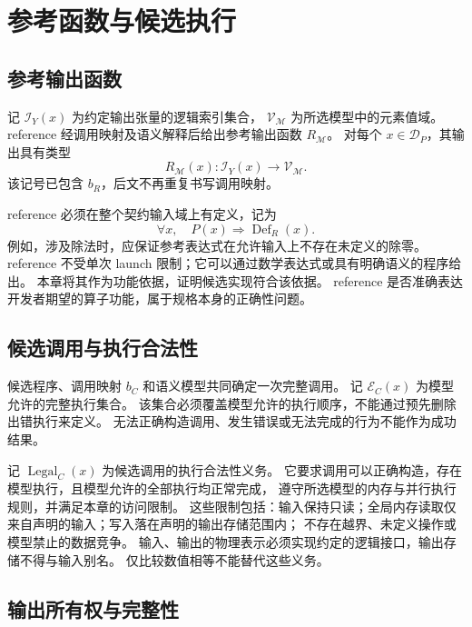 \section{参考函数与候选执行}
\label{sec:opv-semantics}

\subsection{参考输出函数}

记 $\mathcal{I}_Y(x)$ 为约定输出张量的逻辑索引集合，
$\mathcal{V}_{\mathcal{M}}$ 为所选模型中的元素值域。
reference 经调用映射及语义解释后给出参考输出函数 $R_{\mathcal{M}}$。
对每个 $x\in\mathcal{D}_P$，其输出具有类型
\begin{equation}
  R_{\mathcal{M}}(x):
  \mathcal{I}_Y(x)\longrightarrow\mathcal{V}_{\mathcal{M}}.
  \label{eq:opv-reference}
\end{equation}
该记号已包含 $b_R$，后文不再重复书写调用映射。

reference 必须在整个契约输入域上有定义，记为
\begin{equation}
  \forall x,\quad
  P(x)\Longrightarrow\operatorname{Def}_R(x).
  \label{eq:opv-reference-defined}
\end{equation}
例如，涉及除法时，应保证参考表达式在允许输入上不存在未定义的除零。
reference 不受单次 launch 限制；它可以通过数学表达式或具有明确语义的程序给出。
本章将其作为功能依据，证明候选实现符合该依据。
reference 是否准确表达开发者期望的算子功能，属于规格本身的正确性问题。

\subsection{候选调用与执行合法性}

候选程序、调用映射 $b_C$ 和语义模型共同确定一次完整调用。
记 $\mathcal{E}_C(x)$ 为模型允许的完整执行集合。
该集合必须覆盖模型允许的执行顺序，不能通过预先删除出错执行来定义。
无法正确构造调用、发生错误或无法完成的行为不能作为成功结果。

记 $\operatorname{Legal}_C(x)$ 为候选调用的执行合法性义务。
它要求调用可以正确构造，存在模型执行，且模型允许的全部执行均正常完成，
遵守所选模型的内存与并行执行规则，并满足本章的访问限制。
这些限制包括：输入保持只读；全局内存读取仅来自声明的输入；写入落在声明的输出存储范围内；
不存在越界、未定义操作或模型禁止的数据竞争。
输入、输出的物理表示必须实现约定的逻辑接口，输出存储不得与输入别名。
仅比较数值相等不能替代这些义务。

\subsection{输出所有权与完整性}

